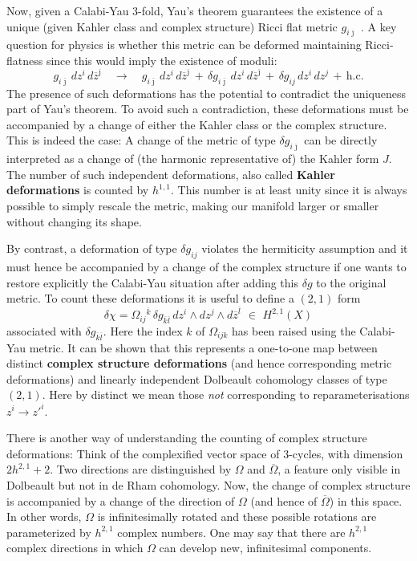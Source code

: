 \documentclass[12pt]{article}
\newcommand{\be}{\begin{equation}}
\newcommand{\ee}{\end{equation}}
\newcommand{\ol}{\overline}
\numberwithin{equation}{section}
\begin{document}
Now, given a Calabi-Yau 3-fold, Yau's theorem guarantees the existence of a unique (given Kahler class and complex structure) Ricci flat metric $g_{i\ol{\jmath}}$ . A key question for physics is whether this metric can be deformed maintaining Ricci-flatness since this would imply the existence of moduli:
\be
g_{i\ol{\jmath}}\,dz^i\,d\ol{z}^{\ol{\jmath}}\quad\to\quad g_{i\ol{\jmath}}
\,dz^i\,d\ol{z}^{\ol{\jmath}}\,+\,\delta g_{i\ol{\jmath}}
\,dz^i\,d\ol{z}^{\ol{\jmath}}\,+\,\delta g_{ij}\,dz^i\,dz^j\,+\,
\mbox{h.c.}
\ee
The presence of such deformations has the potential to contradict the uniqueness part of Yau's theorem. To avoid such a contradiction, these deformations must be accompanied by a change of either the Kahler class or the complex structure. This is indeed the case: A change of the metric of type $\delta g_{i\ol{\jmath}}$ can be directly interpreted as a change of (the harmonic representative of) the Kahler form $J$. The number of such independent deformations, also called {\bf Kahler deformations} is counted by $h^{1,1}$. This number is at least unity since it is always possible to simply rescale the metric, making our manifold larger or smaller without changing its shape. 

By contrast, a deformation of type $\delta g_{ij}$ violates the hermiticity assumption and it must hence be accompanied by a change of the complex structure if one wants to restore explicitly the Calabi-Yau situation after adding this $\delta g$ to the original metric. To count these deformations it is useful to define a $(2,1)$ form
\be
\delta \chi=\Omega_{ij}{}^{\ol{k}}\,\delta g_{\ol{k}\ol{l}}\,dz^i\wedge dz^j\wedge d\ol{z}^{\ol{l}}\,\, \in\,\,H^{2,1}(X)
\ee
associated with $\delta g_{\ol{k}\ol{l}}$. Here the index $k$ of $\Omega_{ijk}$ has been raised using the Calabi-Yau metric. It can be shown that this represents a one-to-one map between distinct {\bf complex structure deformations} (and hence corresponding metric deformations) and linearly independent Dolbeault cohomology classes of type $(2,1)$. Here by distinct we mean those {\it not} corresponding to reparameterisations $z^i\to z'^i$. 

There is another way of understanding the counting of complex structure deformations: Think of the complexified vector space of 3-cycles, with dimension $2h^{2,1}+2$. Two directions are distinguished by $\Omega$ and $\ol{\Omega}$, a feature only visible in Dolbeault but not in de Rham cohomology. Now, the change of complex structure is accompanied by a change of the direction of $\Omega$ (and hence of $\ol{\Omega}$) in this space. In other words, $\Omega$ is infinitesimally rotated and these possible rotations are parameterized by $h^{2,1}$ complex numbers. One may say that there are $h^{2,1}$ complex directions in which $\Omega$ can develop new, infinitesimal components. 
\end{document}
